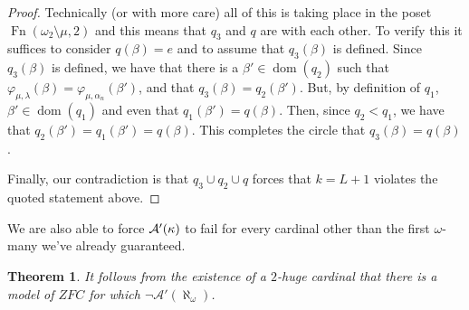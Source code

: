 \documentclass{amsart}
\theoremstyle{plain}
\newtheorem{theorem}{Theorem}
\theoremstyle{definition}
\theoremstyle{remark}
\theoremstyle{plain}
\theoremstyle{definition}
\theoremstyle{remark}
\begin{document}
\begin{proof}
            Technically (or with more care)  all of this is taking place in the
            poset $\operatorname{Fn}(\omega_2\setminus \mu,2)$ and this means
            that $q_3$ and $q$ are  with each other.
            To verify this it suffices to consider
             $q(\beta)=e$ and to assume that $q_3(\beta)$ is defined.
            Since $q_3(\beta)$ is defined, we have that
            there is a  $\beta'\in\mathop{dom}(q_2)$ such that $
             \varphi_{\mu,\lambda}(\beta) = \varphi_{\mu,\alpha_n}(\beta')$,
            and that $q_3(\beta) = q_2(\beta')$.
            But, by definition of $q_1$, $\beta'\in\mathop{dom}(q_1)$
            and even  that $q_1(\beta') = q(\beta)$.
             Then, since $q_2<q_1$, we have that $q_2(\beta')=q_1(\beta') =
             q(\beta)$. This completes the circle that $q_3(\beta) = q(\beta)$.


            Finally, our contradiction is that $q_3\cup q_2\cup q$
            forces that
             $k=L+1$ violates the quoted statement above.
            \end{proof}


  We are also able to force \(\mathcal{A}'(\kappa)\) to fail for every cardinal
  other than the first \(\omega\)-many we've already guaranteed.

            \begin{theorem} It follows from the existence of a $2$-huge cardinal
            that there is a model of $ZFC$ for which $\lnot \mathcal A'(\aleph_{\omega})$.
            \end{theorem}
\end{document}
